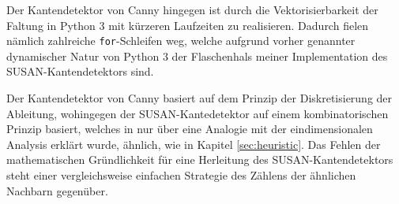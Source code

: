\documentclass[a4paper, 11pt]{report}
\theoremstyle{definition}
\begin{document}
			Der Kantendetektor von Canny hingegen ist durch die Vektorisierbarkeit der Faltung in Python 3 mit kürzeren Laufzeiten zu realisieren. Dadurch fielen nämlich zahlreiche \texttt{for}-Schleifen weg, welche aufgrund vorher genannter dynamischer Natur von Python 3 der Flaschenhals meiner Implementation des SUSAN-Kantendetektors sind.

			Der Kantendetektor von Canny basiert auf dem Prinzip der Diskretisierung der Ableitung, wohingegen der SUSAN-Kantedetektor auf einem kombinatorischen Prinzip basiert, welches in \cite{SUSAN} nur über eine Analogie mit der eindimensionalen Analysis erklärt wurde, ähnlich, wie in Kapitel \ref{sec:heuristic}. Das Fehlen der mathematischen Gründlichkeit für eine Herleitung des SUSAN-Kantendetektors steht einer vergleichsweise einfachen Strategie des Zählens der ähnlichen Nachbarn gegenüber.
\pagebreak
\pagestyle{plain}
\end{document}
